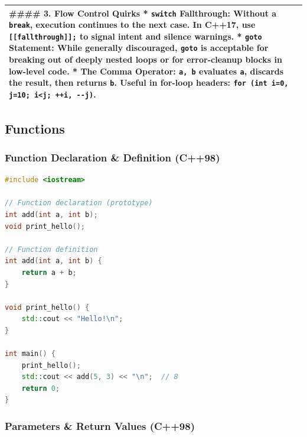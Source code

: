 \begin{longtable}[]{@{}
  >{\raggedright\arraybackslash}p{}@{}}
\#\#\#\# 3. Flow Control Quirks *
\textbf{\passthrough{\lstinline!switch!} Fallthrough}: Without a
\passthrough{\lstinline!break!}, execution continues to the next case.
In C++17, use \passthrough{\lstinline![[fallthrough]];!} to signal
intent and silence warnings. * \textbf{\passthrough{\lstinline!goto!}
Statement}: While generally discouraged, \passthrough{\lstinline!goto!}
is acceptable for breaking out of deeply nested loops or for
error-cleanup blocks in low-level code. * \textbf{The Comma Operator}:
\passthrough{\lstinline!a, b!} evaluates \passthrough{\lstinline!a!},
discards the result, then returns \passthrough{\lstinline!b!}. Useful in
for-loop headers:
\passthrough{\lstinline!for (int i=0, j=10; i<j; ++i, --j)!}. \\
\bottomrule
\end{longtable}

\hypertarget{functions}{%
\subsection{Functions}\label{functions}}

\hypertarget{function-declaration-definition-c98}{%
\subsubsection{Function Declaration \& Definition
(C++98)}\label{function-declaration-definition-c98}}

\begin{lstlisting}[language={C++}]
#include <iostream>

// Function declaration (prototype)
int add(int a, int b);
void print_hello();

// Function definition
int add(int a, int b) {
    return a + b;
}

void print_hello() {
    std::cout << "Hello!\n";
}

int main() {
    print_hello();
    std::cout << add(5, 3) << "\n";  // 8
    return 0;
}
\end{lstlisting}

\hypertarget{parameters-return-values-c98}{%
\subsubsection{Parameters \& Return Values
(C++98)}\label{parameters-return-values-c98}}

